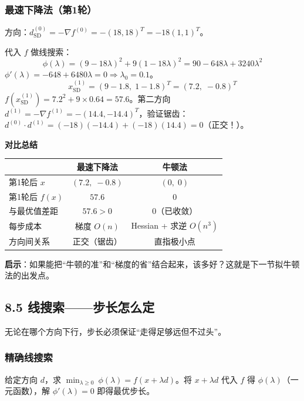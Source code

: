 {\subsubsection{最速下降法（第1轮）}

方向：$d_{\text{SD}}^{(0)} = -\nabla f^{(0)} = -(18, 18)^T = -18(1,1)^T$。

代入 $f$ 做线搜索：
\[
\phi(\lambda) = (9-18\lambda)^2 + 9(1-18\lambda)^2
= 90 - 648\lambda + 3240\lambda^2
\]
$\phi'(\lambda) = -648 + 6480\lambda = 0 \Rightarrow \lambda_0 = 0.1$。
\[
x_{\text{SD}}^{(1)} = (9-1.8,\; 1-1.8)^T = (7.2,\; -0.8)^T
\]
$f(x_{\text{SD}}^{(1)}) = 7.2^2 + 9\times 0.64 = 57.6$。第二方向 $d^{(1)} = -\nabla f^{(1)} = -(14.4, -14.4)^T$，验证锯齿：$d^{(0)}\cdot d^{(1)} = (-18)(-14.4) + (-18)(14.4) = 0$（正交！）。}

\begin{defbox}
\textbf{对比总结}
\smallskip
{\footnotesize
\setlength{\tabcolsep}{3pt}
\begin{tabular}{lcc}
\toprule
& \textbf{最速下降法} & \textbf{牛顿法} \\
\midrule
第1轮后 $x$      & $(7.2,\; -0.8)$         & $(0,\; 0)$ \\
第1轮后 $f(x)$   & $57.6$                   & $0$ \\
与最优值差距       & $57.6 > 0$                & $0$（已收敛） \\
每步成本          & 梯度 $O(n)$               & Hessian + 求逆 $O(n^3)$ \\
方向间关系        & 正交（锯齿）               & 直指极小点 \\
\toprule
\end{tabular}
}
\medskip
\textbf{启示}：如果能把``牛顿的准''和``梯度的省''结合起来，该多好？这就是下一节拟牛顿法的出发点。
\end{defbox}

\subsection{8.5 线搜索——步长怎么定}

无论在哪个方向下行，步长必须保证``走得足够远但不过头''。

\subsubsection{精确线搜索}

给定方向 $d$，求 $\min_{\lambda \ge 0}\ \phi(\lambda) = f(x + \lambda d)$。将 $x+\lambda d$ 代入 $f$ 得 $\phi(\lambda)$（一元函数），解 $\phi'(\lambda) = 0$ 即得最优步长。

